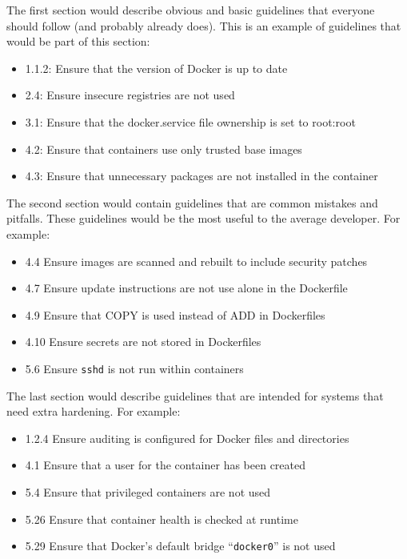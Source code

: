 \hfill

The first section would describe obvious and basic guidelines that everyone should follow (and probably already does). This is an example of guidelines that would be part of this section:
\begin{itemize}
    \item 1.1.2: Ensure that the version of Docker is up to date
    \item 2.4: Ensure insecure registries are not used
    \item 3.1: Ensure that the docker.service file ownership is set to root:root
    \item 4.2: Ensure that containers use only trusted base images
    \item 4.3: Ensure that unnecessary packages are not installed in the container
\end{itemize}

\hfill

The second section would contain guidelines that are common mistakes and pitfalls. These guidelines would be the most useful to the average developer. For example:
\begin{itemize}
    \item 4.4 Ensure images are scanned and rebuilt to include security patches
    \item 4.7 Ensure update instructions are not use alone in the Dockerfile
    \item 4.9 Ensure that COPY is used instead of ADD in Dockerfiles
    \item 4.10 Ensure secrets are not stored in Dockerfiles
    \item 5.6 Ensure \lstinline{sshd} is not run within containers
\end{itemize}

\hfill

The last section would describe guidelines that are intended for systems that need extra hardening. For example:
\begin{itemize}
    \item 1.2.4 Ensure auditing is configured for Docker files and directories
    \item 4.1 Ensure that a user for the container has been created
    \item 5.4 Ensure that privileged containers are not used
    \item 5.26 Ensure that container health is checked at runtime
    \item 5.29 Ensure that Docker's default bridge ``\lstinline{docker0}'' is not used
\end{itemize}
